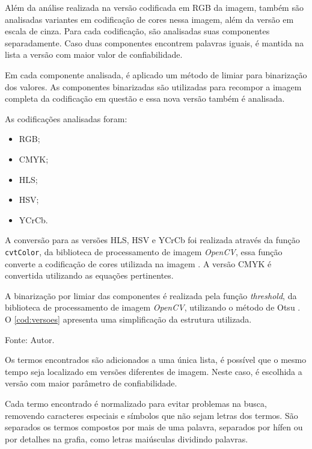 Além da análise realizada na versão codificada em \ac{RGB} da imagem, também são analisadas variantes em codificação de cores nessa imagem, além da versão em escala de cinza.
Para cada codificação, são analisadas suas componentes separadamente.
Caso duas componentes encontrem palavras iguais, é mantida na lista a versão com maior valor de confiabilidade.

Em cada componente analisada, é aplicado um método de limiar para binarização dos valores.
As componentes binarizadas são utilizadas para recompor a imagem completa da codificação em questão e essa nova versão também é analisada.

As codificações analisadas foram:
\begin{itemize}
    \item \ac{RGB};
    \item \ac{CMYK};
    \item HLS;
    \item HSV;
    \item YCrCb.
\end{itemize}

A conversão para as versões HLS, HSV e YCrCb foi realizada através da função \lstinline|cvtColor|, da biblioteca de processamento de imagem \textit{OpenCV}, essa função converte a codificação de cores utilizada na imagem \cite{CV2cvtColor}.
A versão \ac{CMYK} é convertida utilizando as equações pertinentes.

A binarização por limiar das componentes é realizada pela função \textit{threshold}, da biblioteca de processamento de imagem \textit{OpenCV}, utilizando o método de Otsu \cite{CV2threshold}.
O \autoref{cod:versoes} apresenta uma simplificação da estrutura utilizada.


\begin{lstfloat}[htbp]
    \centering
    
    \caption*{Fonte: Autor.}
\end{lstfloat}

Os termos encontrados são adicionados a uma única lista, é possível que o mesmo tempo seja localizado em versões diferentes de imagem. Neste caso, é escolhida a versão com maior parâmetro de confiabilidade.

Cada termo encontrado é normalizado para evitar problemas na busca, removendo caracteres especiais e símbolos que não sejam letras dos termos.
São separados os termos compostos por mais de uma palavra, separados por hífen ou por detalhes na grafia, como letras maiúsculas dividindo palavras.

